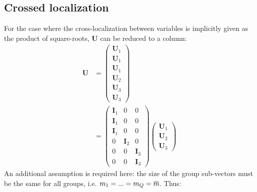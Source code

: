 \documentclass[12pt]{scrartcl}
\newcommand{\overbar}[1]{\mkern 1.5mu\overline{\mkern-1.5mu#1\mkern-1.5mu}\mkern 1.5mu}
\begin{document}
\subsection{Crossed localization}
For the case where the cross-localization between variables is implicitly given as the product of square-roots, $\mathbf{U}$ can be reduced to a column:
\begin{align}
\mathbf{U} & = \left( \begin{array}{c}
\mathbf{U}_1 \\
\mathbf{U}_1 \\
\mathbf{U}_1 \\[0.3ex]
\hline
\mathbf{U}_2 \\[0.3ex]
\hline
\mathbf{U}_3 \\
\mathbf{U}_3
\end{array} \right) \nonumber \\
& = \left( \begin{array}{c|c|c}
\mathbf{I}_1 & 0 & 0 \\
\mathbf{I}_1 & 0 & 0 \\
\mathbf{I}_1 & 0 & 0 \\[0.3ex]
\hline
0 & \mathbf{I}_2 & 0 \\[0.3ex]
\hline
0 & 0 & \mathbf{I}_3 \\
0 & 0 & \mathbf{I}_3
\end{array} \right)
\left( \begin{array}{c}
\mathbf{U}_1 \\[0.3ex]
\hline
\mathbf{U}_2 \\[0.3ex]
\hline
\mathbf{U}_3
\end{array} \right)
\end{align}
An additional assumption is required here: the size of the group sub-vectors must be the same for all groups, i.e. $m_1 = ... = m_Q = \overbar{m}$. Thus:
\end{document}
